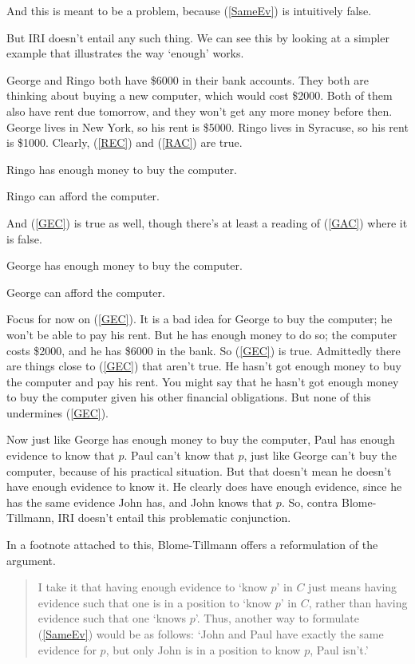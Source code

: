 \documentclass[oneside]{book}
\renewcommand{\numbex}[2]{
\begin{enumerate*}
\setcounter{enumi}{\value{paper}}
\renewcommand{\labelenumi}{(\arabic{enumi})}
#2
\end{enumerate*}
\addtocounter{paper}{#1}}
\begin{document}
\noindent And this is meant to be a problem, because (\ref{SameEv}) is intuitively false.

But IRI doesn't entail any such thing. We can see this by looking at a simpler example that illustrates the way `enough' works. 

George and Ringo both have \$6000 in their bank accounts. They both are thinking about buying a new computer, which would cost \$2000. Both of them also have rent due tomorrow, and they won't get any more money before then. George lives in New York, so his rent is \$5000. Ringo lives in Syracuse, so his rent is \$1000. Clearly, (\ref{REC}) and (\ref{RAC}) are true.

\numbex{2}{
\item \label{REC} Ringo has enough money to buy the computer.
\item \label{RAC} Ringo can afford the computer.}

\noindent And (\ref{GEC}) is true as well, though there's at least a reading of (\ref{GAC}) where it is false.

\numbex{2}{
\item \label{GEC} George has enough money to buy the computer.
\item \label{GAC} George can afford the computer.
}

\noindent Focus for now on (\ref{GEC}). It is a bad idea for George to buy the computer; he won't be able to pay his rent. But he has enough money to do so; the computer costs \$2000, and he has \$6000 in the bank. So (\ref{GEC}) is true. Admittedly there are things close to (\ref{GEC}) that aren't true. He hasn't got enough money to buy the computer and pay his rent. You might say that he hasn't got enough money to buy the computer given his other financial obligations. But none of this undermines (\ref{GEC}). 

Now just like George has enough money to buy the computer, Paul has enough evidence to know that $p$. Paul can't know that $p$, just like George can't buy the computer, because of his practical situation. But that doesn't mean he doesn't have enough evidence to know it. He clearly does have enough evidence, since he has the same evidence John has, and John knows that $p$. So, contra Blome-Tillmann, IRI doesn't entail this problematic conjunction.

In a footnote attached to this, Blome-Tillmann offers a reformulation of the argument.

\begin{quote}
\noindent I take it that having enough evidence to `know $p$' in $C$ just means having evidence such that one is in a position to `know $p$' in $C$, rather than having evidence such that one `knows $p$'. Thus, another way to formulate (\ref{SameEv}) would be as follows: `John and Paul have exactly the same evidence for $p$, but only John is in a position to know $p$, Paul isn't.' \cite[329n23]{MBT2009}
\end{quote}
\end{document}
